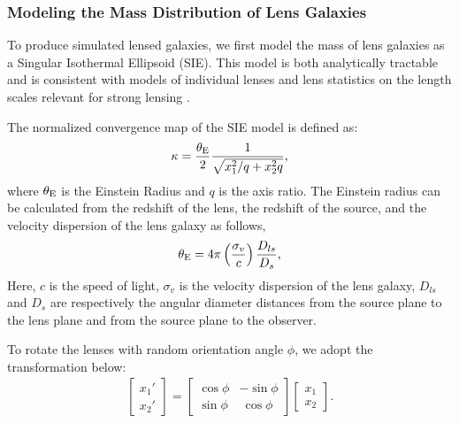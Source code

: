 \documentclass{emulateapj}
\begin{document}
\subsubsection{Modeling the Mass Distribution of Lens Galaxies}

To produce simulated lensed galaxies, we first model the mass of lens
galaxies as a Singular Isothermal Ellipsoid (SIE). This model is
both analytically tractable and is consistent with models of
individual lenses and lens statistics on the length scales relevant
for strong lensing
\citep[e.g.]{koopmans_etal06,gavazzi_etal07,dye_etal08,liandchen_09}.

The normalized convergence map of the SIE model is defined as:
\begin{equation}\label{eqn:sie}
\kappa = \frac{\theta_{\rm E}}{2}\frac{1}{\sqrt{x_1^2/q+x_2^2 q}},
\end{equation}
where $\theta_{\rm E}$ is the Einstein Radius and $q$ is the axis ratio.
The Einstein radius can be calculated from the redshift of the
lens, the redshift of the source, and the velocity dispersion of the
lens galaxy as follows,
\begin{equation}
\theta_{\rm E} = 4\pi\left(\frac{\sigma_v}{c}\right)\frac{D_{ls}}{D_{s}}, 
\end{equation}
Here, $c$ is the speed of light, $\sigma_v$ is the velocity dispersion
of the lens galaxy, $D_{ls}$ and $D_{s}$ are respectively the angular
diameter distances from the source plane to the lens plane and from
the source plane to the observer.

To rotate the lenses with random orientation angle $\phi$, we adopt
the transformation below:
\begin{eqnarray}
\label{eqn:rotation}
\begin{bmatrix}
    x_{1}\prime      \\
    x_{2}\prime 
\end{bmatrix}
= 
\begin{bmatrix}
    \cos \phi  & -\sin \phi      \\
    \sin \phi  & ~\cos \phi      
\end{bmatrix} 
\begin{bmatrix}
    x_1      \\
    x_2      
\end{bmatrix}.
\end{eqnarray}
\end{document}
